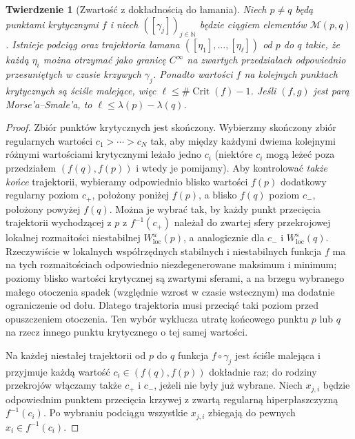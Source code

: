 \documentclass[11pt,a4paper,oneside]{report}
\newcommand{\N}{\mathbb{N}}
\theoremstyle{plain}
\newtheorem{twierdzenie}{Twierdzenie}[section]
\theoremstyle{definition}
\theoremstyle{remark}
\begin{document}
\begin{twierdzenie}[Zwartość z dokładnością do łamania]
\label{thm:morse-broken-compact-v11}
Niech $p\ne q$ będą punktami krytycznymi $f$ i niech
$([\gamma_j])_{j\in\N}$ będzie ciągiem elementów
$\mathcal M(p,q)$.
Istnieje podciąg oraz trajektoria łamana
$([\eta_1],\ldots,[\eta_\ell])$ od $p$ do $q$ takie, że
każdą $\eta_i$ można otrzymać jako granicę $C^\infty$
na zwartych przedziałach odpowiednio \emph{przesuniętych w czasie}
krzywych $\gamma_j$. Ponadto wartości $f$ na kolejnych
punktach krytycznych są ściśle malejące, więc
$\ell\le\#\operatorname{Crit}(f)-1$.
Jeśli $(f,g)$ jest parą Morse'a--Smale'a, to
$\ell\le\lambda(p)-\lambda(q)$.
\end{twierdzenie}
\begin{proof}
Zbiór punktów krytycznych jest skończony. Wybierzmy
skończony zbiór regularnych wartości $c_1>\cdots>c_N$
tak, aby między każdymi dwiema kolejnymi różnymi wartościami
krytycznymi leżało jedno $c_i$ (niektóre $c_i$ mogą leżeć
poza przedziałem $(f(q),f(p))$ i wtedy je pomijamy).
Aby kontrolować \emph{także końce} trajektorii, wybieramy
odpowiednio blisko wartości $f(p)$ dodatkowy regularny
poziom $c_+$, położony poniżej $f(p)$, a blisko $f(q)$
poziom $c_-$, położony powyżej $f(q)$.
Można je wybrać tak, by każdy punkt przecięcia trajektorii
wychodzącej z $p$ z $f^{-1}(c_+)$ należał do zwartej
sfery przekrojowej lokalnej rozmaitości niestabilnej
$W^u_{\mathrm{loc}}(p)$, a analogicznie dla $c_-$
i $W^s_{\mathrm{loc}}(q)$. Rzeczywiście w lokalnych
współrzędnych stabilnych i niestabilnych funkcja $f$
ma na tych rozmaitościach odpowiednio niezdegenerowane
maksimum i minimum; poziomy blisko wartości krytycznej
są zwartymi sferami, a na brzegu wybranego małego
otoczenia spadek (względnie wzrost w czasie wstecznym)
ma dodatnie ograniczenie od dołu. Dlatego trajektoria
musi przeciąć taki poziom przed opuszczeniem otoczenia.
Ten wybór wyklucza utratę końcowego punktu $p$ lub $q$
na rzecz innego punktu krytycznego o tej samej wartości.

Na każdej niestałej trajektorii od $p$ do $q$ funkcja
$f\circ\gamma_j$ jest ściśle malejąca i przyjmuje każdą
wartość $c_i\in(f(q),f(p))$ dokładnie raz; do rodziny
przekrojów włączamy także $c_+$ i $c_-$, jeżeli nie były
już wybrane. Niech
$x_{j,i}$ będzie odpowiednim punktem przecięcia krzywej
z zwartą regularną hiperpłaszczyzną $f^{-1}(c_i)$.
Po wybraniu podciągu wszystkie $x_{j,i}$ zbiegają do pewnych
$x_i\in f^{-1}(c_i)$.


\end{proof}
\end{document}
